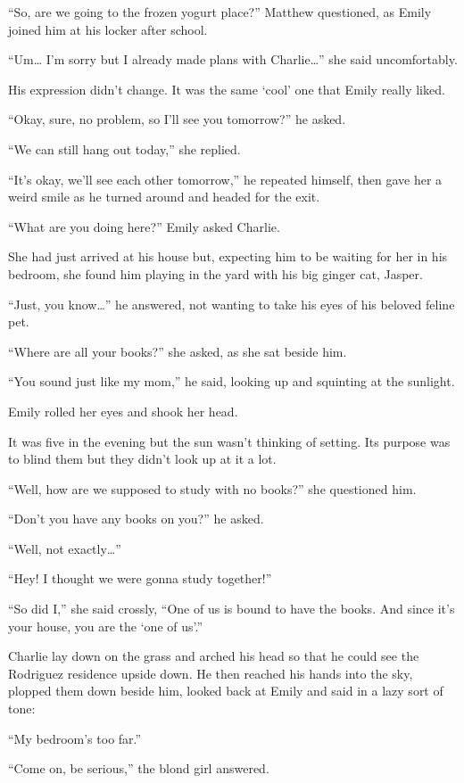 “So, are we going to the frozen yogurt place?” Matthew questioned, as Emily joined him at his locker after school.

“Um… I’m sorry but I already made plans with Charlie…” she said uncomfortably.

His expression didn’t change. It was the same ‘cool’ one that Emily really liked.

“Okay, sure, no problem, so I’ll see you tomorrow?” he asked.

“We can still hang out today,” she replied.

“It’s okay, we’ll see each other tomorrow,” he repeated himself, then gave her a weird smile as he turned around and headed for the exit.

\bigskip

“What are you doing here?” Emily asked Charlie.

She had just arrived at his house but, expecting him to be waiting for her in his bedroom, she found him playing in the yard with his big ginger cat, Jasper.

“Just, you know…” he answered, not wanting to take his eyes of his beloved feline pet.

“Where are all your books?” she asked, as she sat beside him.

“You sound just like my mom,” he said, looking up and squinting at the sunlight.

Emily rolled her eyes and shook her head.

It was five in the evening but the sun wasn’t thinking of setting. Its purpose was to blind them but they didn’t look up at it a lot.

“Well, how are we supposed to study with no books?” she questioned him.

“Don’t you have any books on you?” he asked.

“Well, not exactly…”

“Hey! I thought we were gonna study together!”

“So did I,” she said crossly, “One of us is bound to have the books. And since it’s your house, you are the ‘one of us’.”

Charlie lay down on the grass and arched his head so that he could see the Rodriguez residence upside down. He then reached his hands into the sky, plopped them down beside him, looked back at Emily and said in a lazy sort of tone:

“My bedroom’s too far.”

“Come on, be serious,” the blond girl answered.

